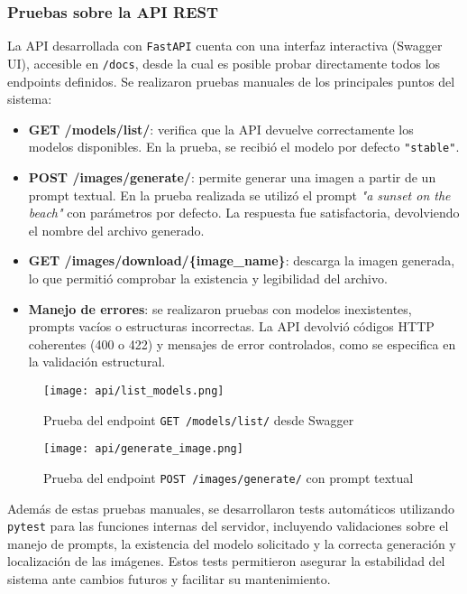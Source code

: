 \subsubsection{Pruebas sobre la API REST}

La API desarrollada con \texttt{FastAPI} cuenta con una interfaz interactiva (Swagger UI), accesible en \texttt{/docs}, desde la cual es posible probar directamente todos los endpoints definidos. Se realizaron pruebas manuales de los principales puntos del sistema:

\begin{itemize}
    \item \textbf{GET /models/list/}: verifica que la API devuelve correctamente los modelos disponibles. En la prueba, se recibió el modelo por defecto \texttt{"stable"}.

    \item \textbf{POST /images/generate/}: permite generar una imagen a partir de un prompt textual. En la prueba realizada se utilizó el prompt \textit{"a sunset on the beach"} con parámetros por defecto. La respuesta fue satisfactoria, devolviendo el nombre del archivo generado.

    \item \textbf{GET /images/download/\{image\_name\}}: descarga la imagen generada, lo que permitió comprobar la existencia y legibilidad del archivo.

    \item \textbf{Manejo de errores}: se realizaron pruebas con modelos inexistentes, prompts vacíos o estructuras incorrectas. La API devolvió códigos HTTP coherentes (400 o 422) y mensajes de error controlados, como se especifica en la validación estructural.
\end{itemize}

\begin{figure}[H]
    \centering
    \texttt{[image: api/list\_models.png]}
    \caption{Prueba del endpoint \texttt{GET /models/list/} desde Swagger}
\end{figure}

\begin{figure}[H]
    \centering
    \texttt{[image: api/generate\_image.png]}
    \caption{Prueba del endpoint \texttt{POST /images/generate/} con prompt textual}
\end{figure}

Además de estas pruebas manuales, se desarrollaron tests automáticos utilizando \texttt{pytest} para las funciones internas del servidor, incluyendo validaciones sobre el manejo de prompts, la existencia del modelo solicitado y la correcta generación y localización de las imágenes. Estos tests permitieron asegurar la estabilidad del sistema ante cambios futuros y facilitar su mantenimiento.


